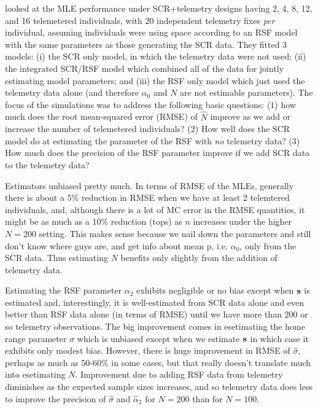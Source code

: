 \citet{royle_etal:2012mee} looked at the MLE performance under SCR+telemetry
designs having
 2, 4, 8, 12, and 16 telemetered individuals, with 20
independent telemetry fixes {\it per} individual, assuming
individuals were using space according to an RSF model with the same
parameters as those generating the SCR data.
They fitted 3 models: (i)
the SCR only model, in which the telemetry data were not used; (ii)
the integrated SCR/RSF model which combined all of the data for
jointly estimating model parameters; and (iii) the RSF only model
which just used the telemetry data alone (and therefore $\alpha_{0}$
and $N$ are not estimable parameters).  The focus of the simulations
was to address the following basic questions: (1) how much does the
root mean-squared error (RMSE) of $\hat{N}$ improve as we add or
increase the number of telemetered individuals?  (2) How well does the
SCR model do at estimating the parameter of the RSF with {\it no}
telemetry data?  (3) How much does the precision of the RSF parameter
improve if we add SCR data to the telemetry data?

Estimators unbiased pretty much.
In terms of RMSE of the MLEs, generally there is about a 5\% reduction
in RMSE when we have at least 2 telemtered individuals,
and, although
there is a lot of MC error in the RMSE quantities, it might be as much
as a 10\% reduction (tops) as $n$ increases under the higher $N=200$ setting. This makes sense because
we nail down the parameters and still don't know where guys are, and
get info about mean p, i.e. $\alpha_{0}$, only from the SCR data. Thus
estimating $N$  benefits only slightly from the addition of telemetry
data.

Estimating the RSF parameter $\alpha_{2}$ exhibits negligible or no
bias except when ${\bf s}$ is estimated and, interestingly, it is
well-estimated from SCR data alone and even better than RSF data alone
(in terms of RMSE) until we have more than 200 or so telemetry
observations.  The big improvement comes in esetimating the home range
parameter $\sigma$ which is unbiased except when we estimate ${\bf s}$
in which case it exhibits only modest bias.  However, there is huge
improvement in RMSE of $\hat{\sigma}$, perhaps as much as 50-60\% in
some cases, but that really doesn't translate much into esetimating
$N$.  Improvement due to adding RSF data from telemetry diminishes as
the expected sample sizes increases, and so telemetry data does less
to improve the precision of
$\hat{\sigma}$ and $\hat{\alpha}_{2}$
for $N=200$ than for $N=100$.



